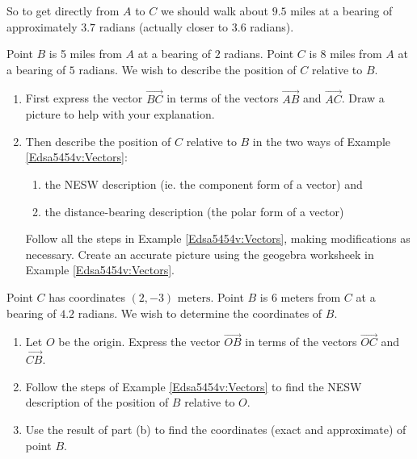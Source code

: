 \documentclass{ximera}
\begin{document}
\begin{example}
\begin{explanation}
\begin{question}
\end{question} 


So to get directly from $A$ to $C$ we should walk about $9.5$ miles at a bearing of approximately $3.7$ radians (actually closer to $3.6$ radians).

\end{explanation}


\end{example}


\begin{question} \label{Qdgg4tnh:Vectors}
Point $B$ is 5 miles from $A$ at a bearing of $2$ radians. Point $C$ is $8$ miles from $A$ at a bearing of $5$ radians. We wish to describe the position of $C$ relative to $B$.

\begin{enumerate}

\item First express the vector $\overrightarrow{BC}$ in terms of the vectors $\overrightarrow{AB}$ and $\overrightarrow{AC}$. Draw a picture to help with your explanation.

\item Then describe  the position of $C$ relative to $B$ in the two ways of Example \ref{Edsa5454v:Vectors}:

\begin{enumerate}
\item the NESW description (ie. the component form of a vector) and

\item the distance-bearing description (the polar form of a vector)

\end{enumerate}

Follow all the steps in Example \ref{Edsa5454v:Vectors}, making modifications as necessary. Create an accurate picture using the geogebra worksheek in Example \ref{Edsa5454v:Vectors}.

\end{enumerate}
\end{question}


\begin{question}  \label{Qdgbht66t554434}
Point $C$ has coordinates $(2,-3)\text{ meters}$. Point $B$ is $6$ meters from $C$ at a bearing of $4.2$ radians. We wish to determine the coordinates of $B$.

\begin{enumerate}
\item Let $O$ be the origin. Express the vector $\overrightarrow{OB}$ in terms of the vectors $\overrightarrow{OC}$ and $\overrightarrow{CB}$. 

\item Follow the steps of Example \ref{Edsa5454v:Vectors} to find the NESW description of the position of $B$ relative to $O$.

\item Use the result of part (b) to find the coordinates (exact and approximate) of point $B$.
\end{enumerate}
\end{question}
\end{document}
